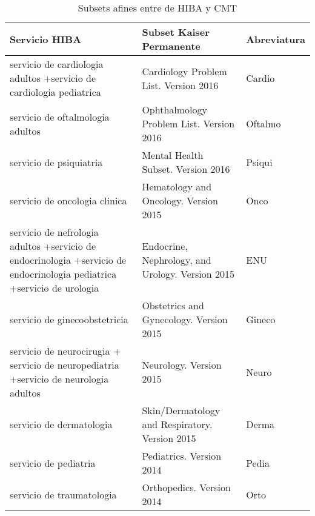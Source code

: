 \begin{table}[htb]
\centering
\caption{Subsets afines entre de HIBA y CMT}
\label{subsetsComparacion}
\begin{tabularx}{\textwidth}{@{}XXl@{}}
\toprule
Servicio HIBA                                                                                                              & Subset Kaiser Permanente & Abreviatura                         \\ \midrule
servicio de cardiologia adultos +\newline  servicio de cardiologia pediatrica                                                       & Cardiology Problem List. Version 2016          & Cardio  \\
servicio de oftalmologia adultos                                                                                           & Ophthalmology Problem List. Version 2016        & Oftalmo \\
servicio de psiquiatria                                                                                                    & Mental Health Subset. Version 2016          & Psiqui     \\
servicio de oncologia clinica                                                                                              & Hematology and Oncology. Version 2015       & Onco     \\
servicio de nefrologia adultos +\newline  servicio de endocrinologia +\newline  servicio de endocrinologia pediatrica +\newline  servicio de urologia & Endocrine, Nephrology, and Urology. Version 2015  & ENU \\
servicio de ginecoobstetricia                                                                                              & Obstetrics and Gynecology. Version 2015        & Gineco  \\
servicio de neurocirugia + servicio de neuropediatria +\newline  servicio de neurologia adultos                                     & Neurology. Version 2015                & Neuro          \\
servicio de dermatologia                                                                                                   & Skin/Dermatology and Respiratory. Version 2015  &Derma  \\
servicio de pediatria                                                                                                      & Pediatrics. Version 2014                     & Pedia    \\
servicio de traumatologia                                                                                                  & Orthopedics. Version 2014                      & Orto  \\ \bottomrule
\end{tabularx}
\end{table}


